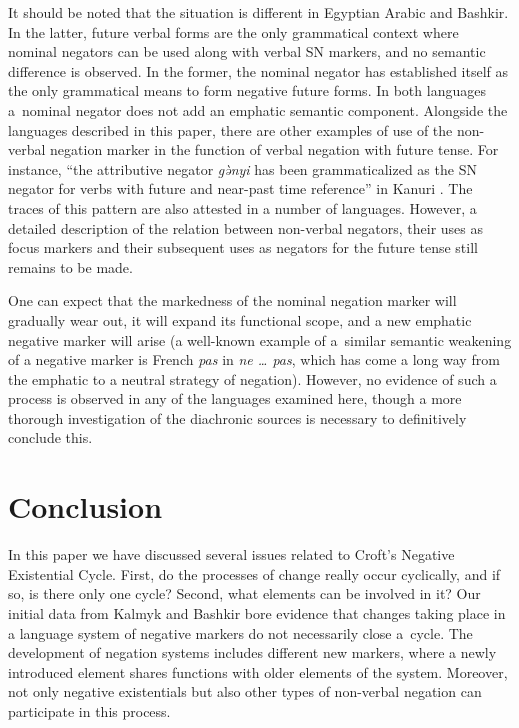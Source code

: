 \documentclass[output=paper,draft,draftmode,colorlinks,citecolor=brown]{langscibook}
\begin{document}
It should be noted that the situation is different in Egyptian Arabic and Bashkir. In the latter, future verbal forms are the only grammatical context where nominal negators can be used along with verbal SN markers, and no semantic difference is observed. In the former, the nominal negator has established itself as the only grammatical means to form negative future forms. In both languages a nominal negator does not add an emphatic semantic component. Alongside the languages described in this paper, there are other examples of use of the non-verbal negation marker in the function of verbal negation with future tense. For instance, “the attributive negator \textit{gə̀nyi} has been grammaticalized as the SN negator for verbs with future and near-past time reference” in Kanuri \citep[172]{Veselinova2016}. The traces of this pattern are also attested in a number of languages. However, a detailed description of the relation between non-verbal negators, their uses as focus markers and their subsequent uses as negators for the future tense still remains to be made.

One can expect that the markedness of the nominal negation marker will gradually wear out, it will expand its functional scope, and a new emphatic negative marker will arise (a well-known example of a similar semantic weakening of a negative marker is French \textit{pas} in \textit{ne … pas}, which has come a long way from the emphatic to a neutral strategy of negation). However, no evidence of such a process is observed in any of the languages examined here, though a more thorough investigation of the diachronic sources is necessary to definitively conclude this.

\section{Conclusion}\label{sec:BK5}

In this paper we have discussed several issues related to Croft’s Negative Existential Cycle. First, do the processes of change really occur cyclically, and if so, is there only one cycle? Second, what elements can be involved in it? Our initial data from Kalmyk and Bashkir bore evidence that changes taking place in a language system of negative markers do not necessarily close a cycle. The development of negation systems includes different new markers, where a newly introduced element shares functions with older elements of the system. Moreover, not only negative existentials but also other types of non-verbal negation can participate in this process.
\end{document}
